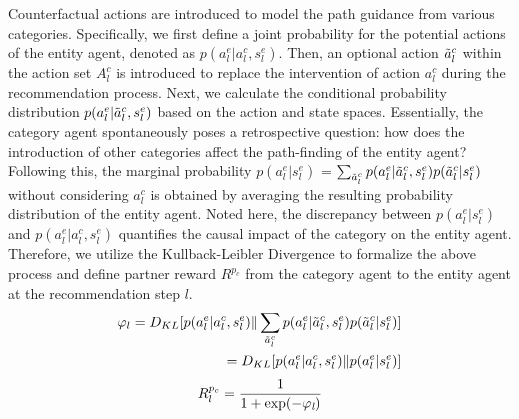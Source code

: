\documentclass[conference]{IEEEtran}
\begin{document}
Counterfactual actions are introduced to model the path guidance from  various  categories. Specifically, we first define a joint probability for the potential actions of the entity agent, denoted as  $p(a_l^e|a_l^c,s_l^e)$. Then, an optional action $\Tilde{a}_l^c$ within the action set $A_l^c$ is introduced to replace the intervention of action $a_l^c$ during the recommendation process. Next, we calculate the conditional probability distribution $p(a_l^e|\Tilde{a}_l^c,s_l^e)$ based on the action and state spaces. Essentially, the category agent spontaneously poses a retrospective question: how does the introduction of other categories affect the path-finding of the entity agent? 
Following this, the marginal probability $p(a_l^e|s_l^e)$ = $\sum_{\Tilde{a}_l^c} p(a_l^e|\Tilde{a}_l^c,s_l^e)p(\Tilde{a}_l^c|s_l^e)$ without considering $a_l^c$ is obtained by averaging the resulting probability distribution of the entity agent. Noted here, %
the discrepancy between $p(a_l^e|s_l^e)$ and $p(a_l^e|a_l^c,s_l^e)$ 
 quantifies the causal impact of the category on the entity agent. %
Therefore, we utilize the Kullback-Leibler Divergence to formalize  the above process and define partner reward $R^{p_c}$ from the category agent to the entity agent at the recommendation step $l$.
\begin{equation}
\begin{split}
\large
   \varphi_{l}=D_{KL}[p(a_l^e|a_l^c,s_l^e)\| \sum_{\Tilde{a}_l^c} p(a_l^e|\Tilde{a}_l^c,s_l^e)p(\Tilde{a}_l^c|s_l^e)] \\
   =D_{KL}[p(a_l^e|a_l^c,s_l^e)\|p(a_l^e|s_l^e)]
   \end{split}
\end{equation}
\begin{equation}
R^{p_c}_l = \frac{1}{1+\rm{exp}(-\varphi_{\emph{l}})}
\end{equation}

\end{document}
